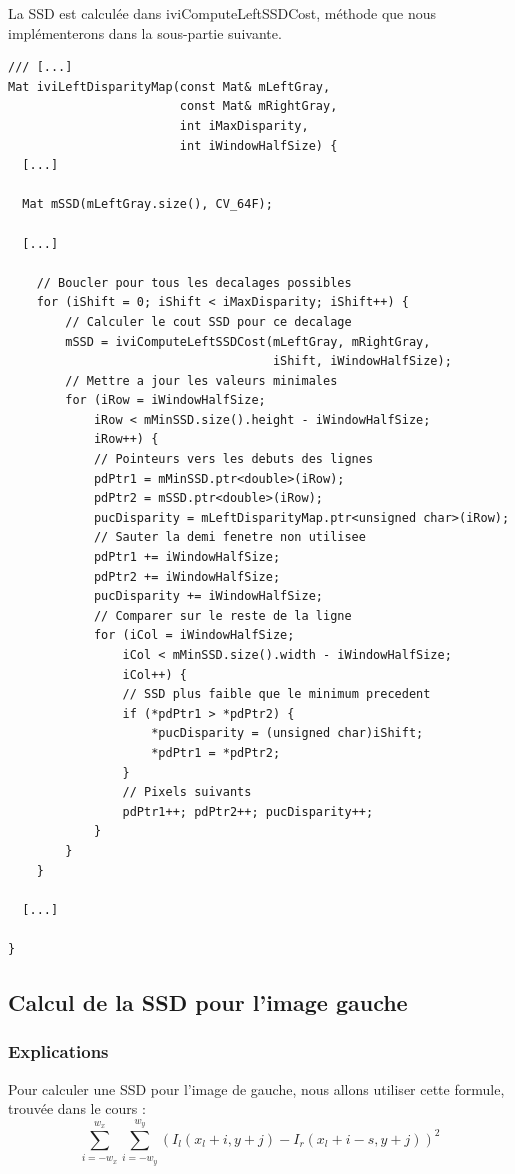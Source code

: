 \documentclass[a4paper]{article}
\begin{document}
La SSD est calculée dans iviComputeLeftSSDCost, méthode que nous implémenterons dans la sous-partie suivante.

\begin{lstlisting}
/// [...]
Mat iviLeftDisparityMap(const Mat& mLeftGray,
                        const Mat& mRightGray,
                        int iMaxDisparity,
                        int iWindowHalfSize) {
  [...]

  Mat mSSD(mLeftGray.size(), CV_64F);

  [...]

    // Boucler pour tous les decalages possibles
    for (iShift = 0; iShift < iMaxDisparity; iShift++) {
        // Calculer le cout SSD pour ce decalage
        mSSD = iviComputeLeftSSDCost(mLeftGray, mRightGray,
                                     iShift, iWindowHalfSize);
        // Mettre a jour les valeurs minimales
        for (iRow = iWindowHalfSize;
            iRow < mMinSSD.size().height - iWindowHalfSize;
            iRow++) {
            // Pointeurs vers les debuts des lignes
            pdPtr1 = mMinSSD.ptr<double>(iRow);
            pdPtr2 = mSSD.ptr<double>(iRow);
            pucDisparity = mLeftDisparityMap.ptr<unsigned char>(iRow);
            // Sauter la demi fenetre non utilisee
            pdPtr1 += iWindowHalfSize;
            pdPtr2 += iWindowHalfSize;
            pucDisparity += iWindowHalfSize;
            // Comparer sur le reste de la ligne
            for (iCol = iWindowHalfSize;
                iCol < mMinSSD.size().width - iWindowHalfSize;
                iCol++) {
                // SSD plus faible que le minimum precedent
                if (*pdPtr1 > *pdPtr2) {
                    *pucDisparity = (unsigned char)iShift;
                    *pdPtr1 = *pdPtr2;
                }
                // Pixels suivants
                pdPtr1++; pdPtr2++; pucDisparity++;
            }
        }
    }

  [...]

}
\end{lstlisting}

\subsection{Calcul de la SSD pour l'image gauche}

\subsubsection{Explications}
Pour calculer une SSD pour l'image de gauche, nous allons utiliser cette formule, trouvée dans le cours :
\begin{equation}
\sum_{i=-w_x}^{w_x} \sum_{i=-w_y}^{w_y} (I_l(x_l+i,y+j)-I_r(x_l+i-s,y+j))^2
\end{equation}
\end{document}

